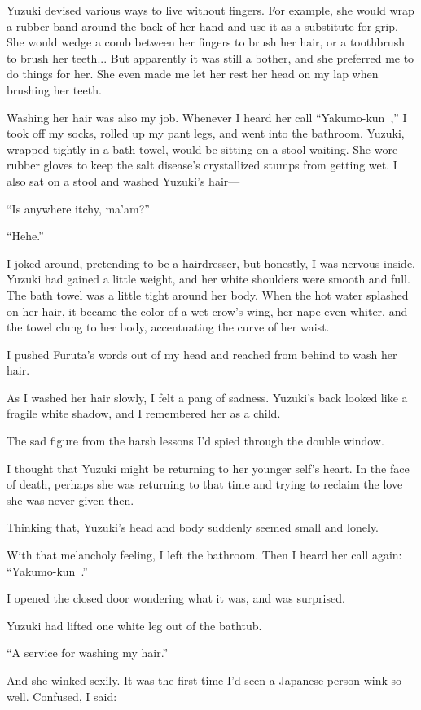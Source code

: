 \documentclass[
    a4paper,
    12pt,
    twoside,
    openany,
    UTF8,
    fontset=windows
]{ctexbook}
\begin{document}
Yuzuki devised various ways to live without fingers. For example, she would wrap a rubber band around the back of her hand and use it as a substitute for grip. She would wedge a comb between her fingers to brush her hair, or a toothbrush to brush her teeth... But apparently it was still a bother, and she preferred me to do things for her. She even made me let her rest her head on my lap when brushing her teeth.

Washing her hair was also my job. Whenever I heard her call ``Yakumo-kun~,'' I took off my socks, rolled up my pant legs, and went into the bathroom. Yuzuki, wrapped tightly in a bath towel, would be sitting on a stool waiting. She wore rubber gloves to keep the salt disease's crystallized stumps from getting wet. I also sat on a stool and washed Yuzuki's hair---

``Is anywhere itchy, ma'am?''

``Hehe.''

I joked around, pretending to be a hairdresser, but honestly, I was nervous inside. Yuzuki had gained a little weight, and her white shoulders were smooth and full. The bath towel was a little tight around her body. When the hot water splashed on her hair, it became the color of a wet crow's wing, her nape even whiter, and the towel clung to her body, accentuating the curve of her waist.

I pushed Furuta's words out of my head and reached from behind to wash her hair.

As I washed her hair slowly, I felt a pang of sadness. Yuzuki's back looked like a fragile white shadow, and I remembered her as a child.

The sad figure from the harsh lessons I'd spied through the double window.

I thought that Yuzuki might be returning to her younger self's heart. In the face of death, perhaps she was returning to that time and trying to reclaim the love she was never given then.

Thinking that, Yuzuki's head and body suddenly seemed small and lonely.

With that melancholy feeling, I left the bathroom. Then I heard her call again: ``Yakumo-kun~.''

I opened the closed door wondering what it was, and was surprised.

Yuzuki had lifted one white leg out of the bathtub.

``A service for washing my hair.''

And she winked sexily. It was the first time I'd seen a Japanese person wink so well. Confused, I said:
\end{document}
